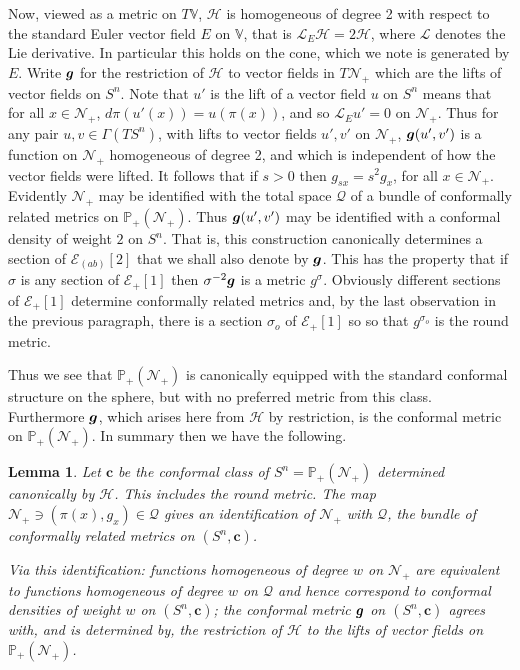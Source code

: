 \documentclass[a4paper,12pt]{amsart}
\def\Cal{\mathcal}
\newcommand{\cc}{\boldsymbol{c}}
\newcommand{\ce}{{\Cal E}}
\def\cQ{\mathcal{Q}}
\def\cH{\mathcal{H}}
\def\cN{\mathcal{N}}
\def\cL{\mathcal{L}}
\def\bg{\mbox{\boldmath $g$}}
\newcommand{\bV}{\mathbb{V}}
\newcommand{\si}{\sigma}
\newtheorem{lemma}[theorem]{Lemma}
\theoremstyle{remark}
\begin{document}
Now, viewed as a metric on $T\bV$, $\mathcal{H}$ is homogeneous of
degree 2 with respect to the standard Euler vector field $E$ on $\bV$,
that is $\cL_E \mathcal{H}=2 \mathcal{H}$, where $\cL$ denotes the Lie
derivative. In particular this holds on the cone, which we note is
generated by $E$.  Write $\bg$ for the restriction of $\mathcal{H}$ to
vector fields in $T\cN_+$ which are the lifts of vector fields on
$S^n$. Note that $u'$ is the lift of a vector field $u$ on $S^n$
means that for all $x\in \cN_+$, $d\pi (u'(x))=u(\pi(x))$, 
and so $\cL_E u'=0$ on $\cN_+$.
Thus for any pair $u,v\in \Gamma(TS^n)$, with lifts to vector fields
$u',v'$ on $\cN_+$, $\bg(u',v')$ is a function on $\cN_+$ homogeneous
of degree 2, and which is independent of how the vector fields were
lifted.  It follows that if $s>0$ then $g_{sx}=s^2g_x$, for all $x\in
\cN_+$.  Evidently $\cN_+$ may be identified with the total space
$\mathcal{Q}$  of a bundle of conformally related metrics on $\mathbb{P}_+ (\cN_+)$. Thus $\bg(u',v')$ may be
identified with a conformal density of weight $2$ on $S^n$. That is,
this construction canonically determines a section of $\ce_{(ab)}[2]$
that we shall also denote by $\bg$. This has the property that if
$\si$ is any section of $\ce_+[1]$ then $\si^{-2}\bg$ is a metric
$g^\si$.  Obviously different sections of $\ce_+[1]$ determine
conformally related metrics and, by the last observation in the
previous paragraph, there is a section $\si_o$ of $\ce_+[1]$ so so
that $g^{\si_o}$ is the round metric. 


Thus we see that $\mathbb{P}_+(\cN_+)$ is canonically equipped with
the standard conformal structure on the sphere, but with no preferred
metric from this class. Furthermore $\bg$, which arises here from
$\mathcal{H}$ by restriction, is the conformal metric on
$\mathbb{P}_+(\cN_+)$.
In summary then we have the following. 
\begin{lemma}\label{NidQ} Let $\cc$ be the conformal 
class of $S^n=\mathbb{P}_+(\cN_+)$ determined canonically by
$\cH$. This includes the round metric.  The map $\cN_+\ni 
(\pi(x),g_x) \in \cQ$ gives an identification of $\cN_+$ with $\cQ$,
the bundle of conformally related metrics on $(S^n,\cc)$.
 
Via this identification: functions homogeneous of degree $w$ on $\cN_+$
are equivalent to functions homogeneous of degree $w$ on $\cQ$ and
hence correspond to conformal densities of weight $w$ on $(S^n,\cc)$; the 
conformal metric $\bg$ on  $(S^n,\cc)$ agrees with, and is determined by, the restriction of $\cH$ to the lifts of vector fields on
$\mathbb{P}_+(\cN_+)$.
\end{lemma}
\end{document}
